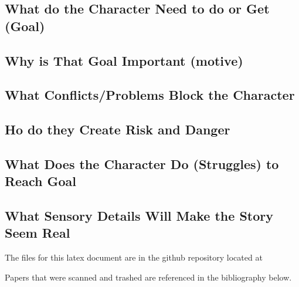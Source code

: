 \documentclass[conference]{IEEEtran}
\begin{document}
\subsection{What do the Character Need to do or Get (Goal)}
\subsection{Why is That Goal Important (motive)}
\subsection{What Conflicts/Problems Block the Character}
\subsection{Ho do they Create Risk and Danger}
\subsection{What Does the Character Do (Struggles) to Reach Goal}
\subsection{What Sensory Details Will Make the Story Seem Real}

The files for this latex document are in the github repository located at 

Papers that were scanned and trashed are referenced in the bibliography below. 
\nocite{*}
\clearpage




\end{document}
